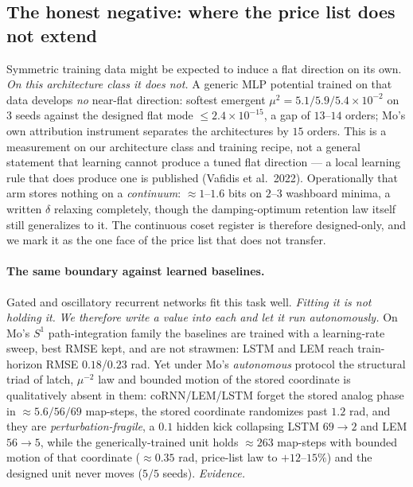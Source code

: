 \documentclass{article}
\begin{document}
\subsection{The honest negative: where the price list does not extend}\label{sec:boundary}

Symmetric training data might be expected to induce a flat direction on its own. \emph{On this architecture class it does not.} A generic MLP potential trained on that data develops \emph{no} near-flat direction: softest emergent $\mu^2=5.1/5.9/5.4\!\times\!10^{-2}$ on $3$ seeds against the designed flat mode $\le2.4\!\times\!10^{-15}$, a gap of $13$--$14$ orders; Mo's own attribution instrument separates the architectures by $15$ orders. This is a measurement on our architecture class and training recipe, not a general statement that learning cannot produce a tuned flat direction --- a local learning rule that does produce one is published (Vafidis et al.\ 2022). Operationally that arm stores nothing on a \emph{continuum}: $\approx1$--$1.6$ bits on $2$--$3$ washboard minima, a written $\delta$ relaxing completely, though the damping-optimum retention law itself still generalizes to it. The continuous coset register is therefore designed-only, and we mark it as the one face of the price list that does not transfer.

\paragraph{The same boundary against learned baselines.} Gated and oscillatory recurrent networks fit this task well. \emph{Fitting it is not holding it.} \emph{We therefore write a value into each and let it run autonomously.} On Mo's $S^1$ path-integration family the baselines are trained with a learning-rate sweep, best RMSE kept, and are not strawmen: LSTM and LEM reach train-horizon RMSE $0.18$/$0.23$ rad. Yet under Mo's \emph{autonomous} protocol the structural triad of latch, $\mu^{-2}$ law and bounded motion of the stored coordinate is qualitatively absent in them: coRNN/LEM/LSTM forget the stored analog phase in $\approx5.6/56/69$ map-steps, the stored coordinate randomizes past $1.2$ rad, and they are \emph{perturbation-fragile}, a $0.1$ hidden kick collapsing LSTM $69\to2$ and LEM $56\to5$, while the generically-trained unit holds $\approx263$ map-steps with bounded motion of that coordinate ($\approx0.35$ rad, price-list law to $+12$--$15\%$) and the designed unit never moves ($5/5$ seeds). \emph{Evidence.}
\end{document}
